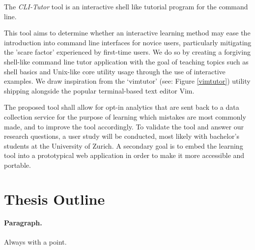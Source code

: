 The \textit{CLI-Tutor} tool is an interactive shell like tutorial program for
the command line.

This tool aims to determine whether an interactive learning method may ease the
introduction into command line interfaces for novice users, particularly
mitigating the 'scare factor' experienced by first-time users. We do so by
creating a forgiving shell-like command line tutor application with the goal of
teaching topics such as shell  basics and Unix-like core utility usage through
the use of interactive examples. We draw inspiration from the
`vimtutor'\cite{pierce_ware_smith_moolenaar_2019} (see: Figure \ref{vimtutor})
utility shipping alongside the popular terminal-based text editor Vim.

The proposed tool shall allow for opt-in analytics that are sent back to a data
collection service for the purpose of learning which mistakes are most commonly
made, and to improve the tool accordingly. To validate the tool and answer our
research questions, a user study will be conducted, most likely with bachelor's
students at the University of Zurich. A secondary goal is to embed the learning
tool into a prototypical web application in order to make it more accessible
and portable.


\section{Thesis Outline}

\paragraph{Paragraph.} Always with a point. {}
